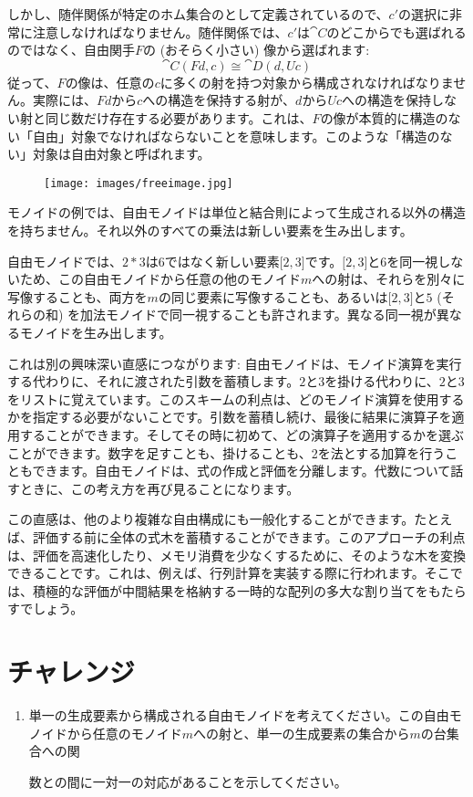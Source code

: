 \noindent
しかし、随伴関係が特定のホム集合のとして定義されているので、$c'$の選択に非常に注意しなければなりません。随伴関係では、$c'$は$\cat{C}$のどこからでも選ばれるのではなく、自由関手$F$の (おそらく小さい) 像から選ばれます:
\[\cat{C}(F d, c) \cong \cat{D}(d, U c)\]
従って、$F$の像は、任意の$c$に多くの射を持つ対象から構成されなければなりません。実際には、$F d$から$c$への構造を保持する射が、$d$から$U c$への構造を保持しない射と同じ数だけ存在する必要があります。これは、$F$の像が本質的に構造のない「自由」対象でなければならないことを意味します。このような「構造のない」対象は自由対象と呼ばれます。

\begin{figure}[H]
  \centering
  \texttt{[image: images/freeimage.jpg]}
\end{figure}

\noindent
モノイドの例では、自由モノイドは単位と結合則によって生成される以外の構造を持ちません。それ以外のすべての乗法は新しい要素を生み出します。

自由モノイドでは、$2 * 3$は$6$ではなく新しい要素${[}2, 3{]}$です。${[}2, 3{]}$と$6$を同一視しないため、この自由モノイドから任意の他のモノイド$m$への射は、それらを別々に写像することも、両方を$m$の同じ要素に写像することも、あるいは${[}2, 3{]}$と$5$ (それらの和) を加法モノイドで同一視することも許されます。異なる同一視が異なるモノイドを生み出します。

これは別の興味深い直感につながります: 自由モノイドは、モノイド演算を実行する代わりに、それに渡された引数を蓄積します。$2$と$3$を掛ける代わりに、$2$と$3$をリストに覚えています。このスキームの利点は、どのモノイド演算を使用するかを指定する必要がないことです。引数を蓄積し続け、最後に結果に演算子を適用することができます。そしてその時に初めて、どの演算子を適用するかを選ぶことができます。数字を足すことも、掛けることも、2を法とする加算を行うこともできます。自由モノイドは、式の作成と評価を分離します。代数について話すときに、この考え方を再び見ることになります。

この直感は、他のより複雑な自由構成にも一般化することができます。たとえば、評価する前に全体の式木を蓄積することができます。このアプローチの利点は、評価を高速化したり、メモリ消費を少なくするために、そのような木を変換できることです。これは、例えば、行列計算を実装する際に行われます。そこでは、積極的な評価が中間結果を格納する一時的な配列の多大な割り当てをもたらすでしょう。

\section{チャレンジ}

\begin{enumerate}
  \tightlist
  \item
        単一の生成要素から構成される自由モノイドを考えてください。この自由モノイドから任意のモノイド$m$への射と、単一の生成要素の集合から$m$の台集合への関

数との間に一対一の対応があることを示してください。
\end{enumerate}

